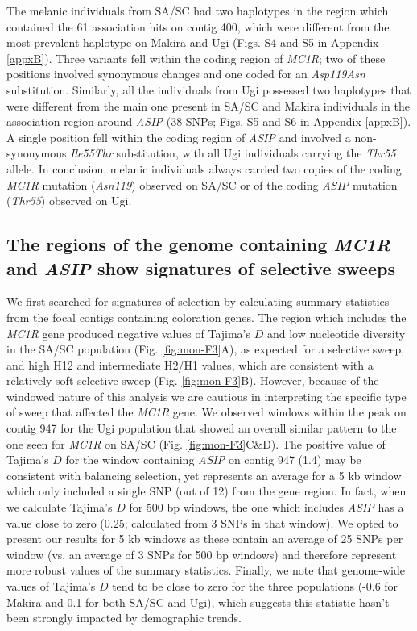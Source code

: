 The melanic individuals from \ac{SA/SC} had two haplotypes in the region which contained the 61 association hits on contig 400, which were different from the most prevalent haplotype on Makira and Ugi (Figs. \href{https://journals.plos.org/PLOSGENETICS/article?id=10.1371/journal.pgen.1010474#sec017}{S4 and S5} in Appendix \ref{appxB}). Three variants fell within the coding region of \textit{MC1R}; two of these positions involved synonymous changes and one coded for an \textit{Asp119Asn} substitution. Similarly, all the individuals from Ugi possessed two haplotypes that were different from the main one present in \ac{SA/SC} and Makira individuals in the association region around \textit{ASIP} (38 \acsp{SNP}; Figs. \href{https://journals.plos.org/PLOSGENETICS/article?id=10.1371/journal.pgen.1010474#sec017}{S5 and S6} in Appendix \ref{appxB}). A single position fell within the coding region of \textit{ASIP} and involved a non-synonymous \textit{Ile55Thr} substitution, with all Ugi individuals carrying the \textit{Thr55} allele. In conclusion, melanic individuals always carried two copies of the coding \textit{MC1R} mutation (\textit{Asn119}) observed on \ac{SA/SC} or of the coding \textit{ASIP} mutation (\textit{Thr55}) observed on Ugi.

\subsection{The regions of the genome containing \textit{MC1R} and \textit{ASIP} show signatures of selective sweeps}
We first searched for signatures of selection by calculating summary statistics from the focal contigs containing coloration genes. The region which includes the \textit{MC1R} gene produced negative values of Tajima’s $D$ and low nucleotide diversity in the \ac{SA/SC} population (Fig. \ref{fig:mon-F3}A), as expected for a selective sweep, and high H12 and intermediate H2/H1 values, which are consistent with a relatively soft selective sweep (Fig. \ref{fig:mon-F3}B). However, because of the windowed nature of this analysis we are cautious in interpreting the specific type of sweep that affected the \textit{MC1R} gene. We observed windows within the peak on contig 947 for the Ugi population that showed an overall similar pattern to the one seen for \textit{MC1R} on \ac{SA/SC} (Fig. \ref{fig:mon-F3}C\&D). The positive value of Tajima’s $D$ for the window containing \textit{ASIP} on contig 947 (1.4) may be consistent with balancing selection, yet represents an average for a 5 kb window which only included a single \acs{SNP} (out of 12) from the gene region. In fact, when we calculate Tajima’s $D$ for 500 bp windows, the one which includes \textit{ASIP} has a value close to zero (0.25; calculated from 3 \acsp{SNP} in that window). We opted to present our results for 5 kb windows as these contain an average of 25 \acsp{SNP} per window (vs. an average of 3 \acsp{SNP} for 500 bp windows) and therefore represent more robust values of the summary statistics. Finally, we note that genome-wide values of Tajima’s $D$ tend to be close to zero for the three populations (-0.6 for Makira and 0.1 for both \ac{SA/SC} and Ugi), which suggests this statistic hasn’t been strongly impacted by demographic trends.


